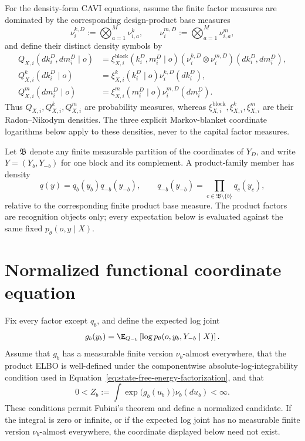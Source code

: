 For the density-form CAVI equations, assume the finite factor measures are dominated by the corresponding design-product base measures
\begin{equation}
\nu_i^{k,D}:=\bigotimes_{a=1}^{M}\nu_{i,a}^{k},
\qquad
\nu_i^{m,D}:=\bigotimes_{a=1}^{M}\nu_{i,a}^{m},
\label{eq:mean-field-factor-base-measures}
\end{equation}
and define their distinct density symbols by
\begin{align}
Q_{X,i}(dk_i^D,dm_i^D\mid o)
&=\xi^{\mathrm{block}}_{X,i}(k_i^D,m_i^D\mid o)
\left(\nu_i^{k,D}\otimes\nu_i^{m,D}\right)(dk_i^D,dm_i^D),
\label{eq:agent-block-factor-density}\\
Q^k_{X,i}(dk_i^D\mid o)
&=\xi^k_{X,i}(k_i^D\mid o)\nu_i^{k,D}(dk_i^D),
\label{eq:state-factor-density}\\
Q^m_{X,i}(dm_i^D\mid o)
&=\xi^m_{X,i}(m_i^D\mid o)\nu_i^{m,D}(dm_i^D).
\label{eq:model-factor-density}
\end{align}
Thus \(Q_{X,i},Q^k_{X,i},Q^m_{X,i}\) are probability measures, whereas \(\xi^{\mathrm{block}}_{X,i},\xi^k_{X,i},\xi^m_{X,i}\) are their Radon--Nikodym densities. The three explicit Markov-blanket coordinate logarithms below apply to these densities, never to the capital factor measures.

Let \(\mathfrak B\) denote any finite measurable partition of the coordinates of \(Y_D\), and write \(Y=(Y_b,Y_{-b})\) for one block and its complement. A product-family member has density
\begin{equation}
q(y)=q_b(y_b)q_{-b}(y_{-b}),
\qquad
q_{-b}(y_{-b})=\prod_{c\in\mathfrak B\setminus\{b\}}q_c(y_c),
\label{eq:generic-product-recognition-density}
\end{equation}
relative to the corresponding finite product base measure. The product factors are recognition objects only; every expectation below is evaluated against the same fixed \(p_\theta(o,y\mid X)\).

\section{Normalized functional coordinate equation}

Fix every factor except \(q_b\), and define the expected log joint
\begin{equation}
g_b(y_b)
=\E_{Q_{-b}}\left[\log p_\theta(o,y_b,Y_{-b}\mid X)\right].
\label{eq:cavi-expected-log-joint}
\end{equation}
Assume that \(g_b\) has a measurable finite version \(\nu_b\)-almost everywhere, that the product ELBO is well-defined under the componentwise absolute-log-integrability condition used in Equation~\eqref{eq:state-free-energy-factorization}, and that
\begin{equation}
0<Z_b
:=\int \exp\bigl(g_b(u_b)\bigr)\nu_b(du_b)<\infty.
\label{eq:cavi-coordinate-existence}
\end{equation}
These conditions permit Fubini's theorem and define a normalized candidate. If the integral is zero or infinite, or if the expected log joint has no measurable finite version \(\nu_b\)-almost everywhere, the coordinate displayed below need not exist.

